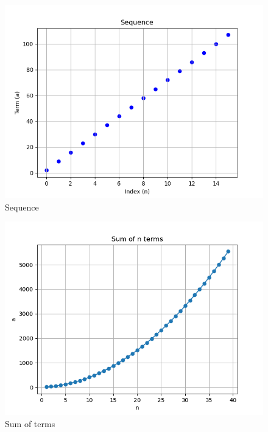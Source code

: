 \documentclass[journal,12pt,twocolumn]{IEEEtran}
\theoremstyle{remark}
\begin{document}
\begin{enumerate}
\begin{figure}[h]
\includegraphics[width=\columnwidth]{fig/generalterm.png}

\begin{center}
    \caption{Sequence}
\end{center}
    
    \label{fig:Sound Wave}
\end{figure}


\begin{figure}[h]
    \centering  

\includegraphics[width=\columnwidth]{fig/sumplot.png}

\begin{center}
    \caption{Sum of terms}
\end{center}
    
    \label{fig:}
\end{figure}


\end{enumerate}
\end{document}
